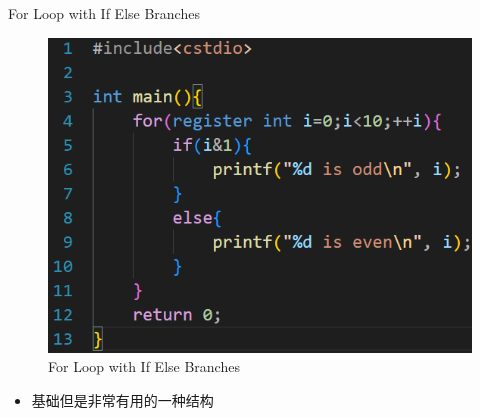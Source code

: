 \documentclass{beamer}
\begin{document}
\begin{frame}{For Loop with If Else Branches}
    \begin{minipage}{0.45\linewidth}
        \begin{figure}
        \centering
        \includegraphics[width=\linewidth]{pic/For Loop with If Else Branches.png}
        \caption{For Loop with If Else Branches}
        \label{fig:For_Loop_with_If_Else_Branches}
    \end{figure}
    \end{minipage}
    \hspace{1cm}
    \begin{minipage}{0.37\linewidth}
        \begin{itemize}
            \item 基础但是非常有用的一种结构
        \end{itemize}
    \end{minipage}
\end{frame}
\end{document}

